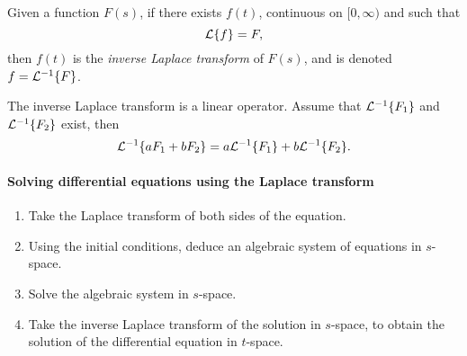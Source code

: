 
\begin{definition}
Given a function $F(s)$, if there exists $f(t)$, continuous on $[0,\infty)$ and such that
\[
\mathcal{L}\{f\}=F,
\]
then $f(t)$ is the \emph{inverse Laplace transform} of $F(s)$, and is denoted $f=\mathcal{L}^{-1}\{F\}$.
\end{definition}
\begin{theorem}
The inverse Laplace transform is a linear operator. Assume that $\mathcal{L}^{-1}\{F_1\}$ and $\mathcal{L}^{-1}\{F_2\}$ exist, then
\[
\mathcal{L}^{-1}\{aF_1+bF_2\}=a\mathcal{L}^{-1}\{F_1\}+b\mathcal{L}^{-1}\{F_2\}.
\]
\end{theorem}

\paragraph{Solving differential equations using the Laplace transform}
\begin{enumerate}
\item Take the Laplace transform of both sides of the equation.
\item Using the initial conditions, deduce an algebraic system of equations in $s$-space.
\item Solve the algebraic system in $s$-space.
\item Take the inverse Laplace transform of the solution in $s$-space, to obtain the solution of the differential equation in $t$-space.
\end{enumerate}












